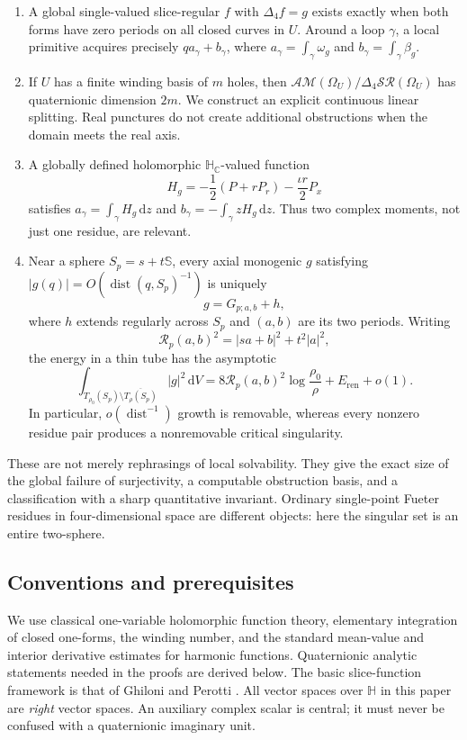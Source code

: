 \documentclass[11pt,a4paper]{article}
\numberwithin{equation}{section}
\theoremstyle{definition}
\theoremstyle{remark}
\newcommand{\C}{\mathbb C}
\newcommand{\HH}{\mathbb H}
\newcommand{\HC}{\mathbb H_{\C}}
\newcommand{\SSS}{\mathbb S}
\newcommand{\SR}{\mathcal{SR}}
\newcommand{\AM}{\mathcal{AM}}
\newcommand{\Fu}{\Delta_4}
\newcommand{\dd}{\,\mathrm d}
\newcommand{\dist}{\operatorname{dist}}
\begin{document}
\begin{enumerate}[label=\textup{(\roman*)}]
\item A global single-valued slice-regular $f$ with $\Fu f=g$ exists
exactly when both forms have zero periods on all closed curves in $U$.
Around a loop $\gamma$, a local primitive acquires precisely
$q a_\gamma+b_\gamma$, where
$a_\gamma=\int_\gamma\omega_g$ and $b_\gamma=\int_\gamma\beta_g$.
\item If $U$ has a finite winding basis of $m$ holes, then
$\AM(\Omega_U)/\Fu\SR(\Omega_U)$ has quaternionic dimension $2m$.
We construct an explicit continuous linear splitting. Real punctures do not
create additional obstructions when the domain meets the real axis.
\item A globally defined holomorphic $\HC$-valued function
\[
 H_g=-\frac12(P+rP_r)-\frac{\iota r}{2}P_x
\]
satisfies $a_\gamma=\int_\gamma H_g\dd z$ and
$b_\gamma=-\int_\gamma zH_g\dd z$. Thus two complex moments, not just one
residue, are relevant.
\item Near a sphere $S_p=s+t\SSS$, every axial monogenic $g$ satisfying
$|g(q)|=O(\dist(q,S_p)^{-1})$ is uniquely
\[
 g=G_{p;a,b}+h,
\]
where $h$ extends regularly across $S_p$ and $(a,b)$ are its two periods.
Writing
\begin{equation}
 \mathcal R_p(a,b)^2=|sa+b|^2+t^2|a|^2,\label{eq:intro-resnorm}
\end{equation}
the energy in a thin tube has the asymptotic
\[
 \int_{T_{\rho_0}(S_p)\setminus\overline{T_\rho(S_p)}}|g|^2\dd V
 =8\mathcal R_p(a,b)^2\log\frac{\rho_0}{\rho}
   +E_{\mathrm{ren}}+o(1).
\]
In particular, $o(\dist^{-1})$ growth is removable, whereas every nonzero
residue pair produces a nonremovable critical singularity.
\end{enumerate}

These are not merely rephrasings of local solvability. They give the exact
size of the global failure of surjectivity, a computable obstruction basis,
and a classification with a sharp quantitative invariant. Ordinary
single-point Fueter residues in four-dimensional space are different objects:
here the singular set is an entire two-sphere.

\subsection{Conventions and prerequisites}
We use classical one-variable holomorphic function theory, elementary
integration of closed one-forms, the winding number, and the standard
mean-value and interior derivative estimates for harmonic functions.
Quaternionic analytic statements needed in the proofs are derived below.
The basic slice-function framework is that of Ghiloni and Perotti
\cite{GP}. All vector spaces over $\HH$ in this paper are \emph{right}
vector spaces. An auxiliary complex scalar is central; it must never be
confused with a quaternionic imaginary unit.
\end{document}
